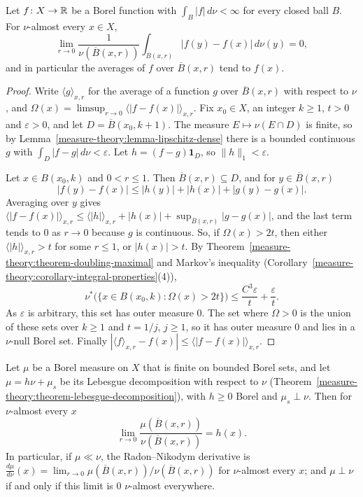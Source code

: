 \begin{theorem}\label{measure-theory:theorem-doubling-lebesgue}
Let $f \colon X \to \mathbb{R}$ be a Borel function with $\int_B|f|\,d\nu < \infty$ for every closed ball $B$. For $\nu$-almost every $x \in X$,
\[
\lim_{r \to 0}\frac{1}{\nu(\overline{B}(x, r))}\int_{\overline{B}(x, r)}|f(y) - f(x)|\,d\nu(y) = 0,
\]
and in particular the averages of $f$ over $\overline{B}(x, r)$ tend to $f(x)$.
\end{theorem}

\begin{proof}
Write $\langle g \rangle_{x, r}$ for the average of a function $g$ over $\overline{B}(x, r)$ with respect to $\nu$, and $\Omega(x) = \limsup_{r \to 0}\langle|f - f(x)|\rangle_{x, r}$. Fix $x_0 \in X$, an integer $k \geq 1$,
$t > 0$ and $\varepsilon > 0$, and let $D = \overline{B}(x_0, k + 1)$. The measure $E \mapsto \nu(E \cap D)$ is finite, so by Lemma~\ref{measure-theory:lemma-lipschitz-dense} there is a bounded continuous $g$ with
$\int_D|f - g|\,d\nu < \varepsilon$. Let $h = (f - g)\mathbf{1}_D$, so $\|h\|_1 < \varepsilon$.

Let $x \in B(x_0, k)$ and $0 < r \leq 1$. Then $\overline{B}(x, r) \subseteq D$, and for $y \in \overline{B}(x, r)$
\[
|f(y) - f(x)| \leq |h(y)| + |h(x)| + |g(y) - g(x)| .
\]
Averaging over $y$ gives $\langle|f - f(x)|\rangle_{x, r} \leq \langle|h|\rangle_{x, r} + |h(x)| + \sup_{\overline{B}(x, r)}|g - g(x)|$, and the last term tends to $0$ as $r \to 0$ because $g$ is continuous. So, if
$\Omega(x) > 2t$, then either $\langle|h|\rangle_{x, r} > t$ for some $r \leq 1$, or $|h(x)| > t$. By Theorem~\ref{measure-theory:theorem-doubling-maximal} and Markov's inequality
(Corollary~\ref{measure-theory:corollary-integral-properties}(4)),
\[
\nu^*\bigl(\{x \in B(x_0, k) : \Omega(x) > 2t\}\bigr) \leq \frac{C^3\varepsilon}{t} + \frac{\varepsilon}{t} .
\]
As $\varepsilon$ is arbitrary, this set has outer measure $0$. The set where $\Omega > 0$ is the union of these sets over $k \geq 1$ and $t = 1/j$, $j \geq 1$, so it has outer measure $0$ and lies in a
$\nu$-null Borel set. Finally $|\langle f \rangle_{x, r} - f(x)| \leq \langle|f - f(x)|\rangle_{x, r}$.
\end{proof}

\begin{theorem}\label{measure-theory:theorem-doubling-differentiation}
Let $\mu$ be a Borel measure on $X$ that is finite on bounded Borel sets, and let $\mu = h\nu + \mu_s$ be its Lebesgue decomposition with respect to $\nu$
(Theorem~\ref{measure-theory:theorem-lebesgue-decomposition}), with $h \geq 0$ Borel and $\mu_s \perp \nu$. Then for $\nu$-almost every $x$
\[
\lim_{r \to 0}\frac{\mu(\overline{B}(x, r))}{\nu(\overline{B}(x, r))} = h(x) .
\]
In particular, if $\mu \ll \nu$, the Radon--Nikodym derivative is $\frac{d\mu}{d\nu}(x) = \lim_{r \to 0}\mu(\overline{B}(x, r))/\nu(\overline{B}(x, r))$ for $\nu$-almost every $x$; and $\mu \perp \nu$ if and only
if this limit is $0$ $\nu$-almost everywhere.
\end{theorem}

